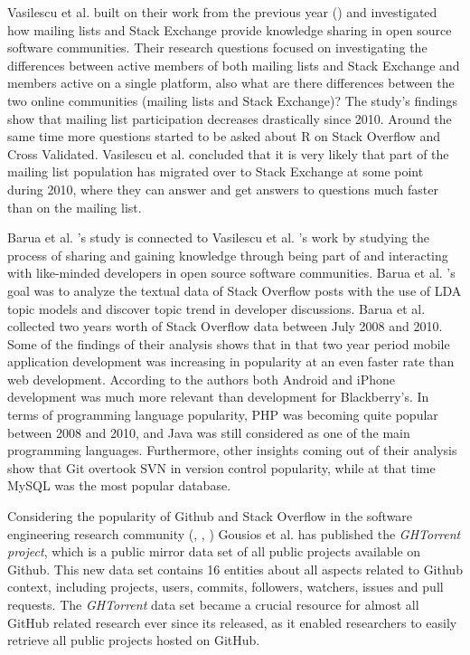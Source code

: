         Vasilescu et al. \cite{vasilescu2014social} built on their work from the previous year (\cite{vasilescu2013stackoverflow}) and investigated how mailing lists and Stack Exchange provide knowledge sharing in open source software communities. Their research questions focused on investigating the differences between active members of both mailing lists and Stack Exchange and members active on a single platform, also what are there differences between the two online communities (mailing lists and Stack Exchange)? The study's findings show that mailing list participation decreases drastically since 2010. Around the same time more questions started to be asked about R on Stack Overflow and Cross Validated. Vasilescu et al. concluded that it is very likely that part of the mailing list population has migrated over to Stack Exchange at some point during 2010, where they can answer and get answers to questions much faster than on the mailing list.
        
        Barua et al. \cite{barua2014developers}'s study is connected to Vasilescu et al. \cite{vasilescu2014social}'s work by studying the process of sharing and gaining knowledge through being part of and interacting with like-minded developers in open source software communities. Barua et al. \cite{barua2014developers}'s goal was to analyze the textual data of Stack Overflow posts with the use of LDA topic models and discover topic trend in developer discussions. Barua et al. collected two years worth of Stack Overflow data between July 2008 and 2010. Some of the findings of their analysis shows that in that two year period mobile application development was increasing in popularity at an even faster rate than web development. According to the authors both Android and iPhone development was much more relevant than development for Blackberry's. In terms of programming language popularity, PHP was becoming quite popular between 2008 and 2010, and  Java was still considered as one of the main programming languages. Furthermore, other insights coming out of their analysis show that Git overtook SVN in version control popularity, while at that time MySQL was the most popular database.
        
        Considering the popularity of Github and Stack Overflow in the software engineering research community (\cite{vasilescu2013stackoverflow}, \cite{badashian2014involvement}, \cite{lee2017github}) Gousios et al. \cite{gousios2013ghtorent} has published the \emph{GHTorrent project}, which is a public mirror data set of all public projects available on Github. This new data set contains 16 entities about all aspects related to Github context, including projects, users, commits, followers, watchers, issues and pull requests. The \emph{GHTorrent} data set became a crucial resource for almost all GitHub related research ever since its released, as it enabled researchers to easily retrieve all public projects hosted on GitHub. 
        
